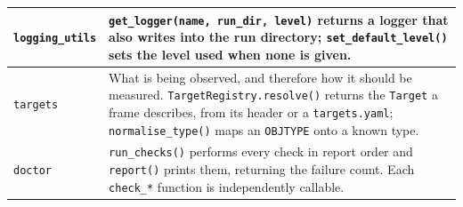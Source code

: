 \documentclass[11pt,a4paper]{article}
\begin{document}
\begin{center}
\begin{longtable}{|p{3.6cm}|p{10.9cm}|}
\hline
\texttt{logging\_utils} & \texttt{get\_logger(name, run\_dir, level)} returns a logger that also writes into the run directory; \texttt{set\_default\_level()} sets the level used when none is given. \\
\hline
\texttt{targets} & What is being observed, and therefore how it should be measured. \texttt{TargetRegistry.resolve()} returns the \texttt{Target} a frame describes, from its header or a \texttt{targets.yaml}; \texttt{normalise\_type()} maps an \texttt{OBJTYPE} onto a known type. \\
\hline
\texttt{doctor} & \texttt{run\_checks()} performs every check in report order and \texttt{report()} prints them, returning the failure count. Each \texttt{check\_*} function is independently callable. \\
\hline
\end{longtable}
\end{center}
\end{document}
